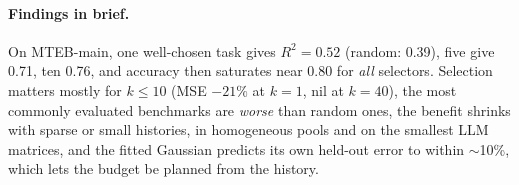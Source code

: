\paragraph{Findings in brief.} On MTEB-main, one well-chosen task gives $R^2=0.52$ (random: 0.39), five give 0.71, ten 0.76, and accuracy then saturates near 0.80 for \emph{all} selectors. Selection matters mostly for $k\le10$ (MSE $-21\%$ at $k=1$, nil at $k=40$), the most commonly evaluated benchmarks are \emph{worse} than random ones, the benefit shrinks with sparse or small histories, in homogeneous pools and on the smallest LLM matrices, and the fitted Gaussian predicts its own held-out error to within $\sim$10\%, which lets the budget be planned from the history.
